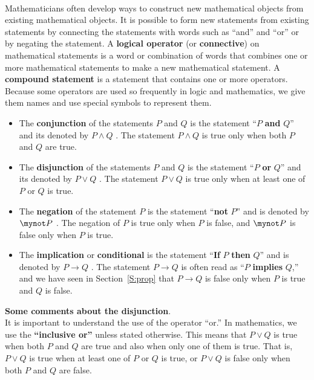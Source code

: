 \begin{previewactivity}\label{PA:compound} \hfill \\
Mathematicians often develop ways to construct new mathematical objects from existing mathematical objects.  It is possible to form new statements from existing statements by connecting the statements with words such as ``and'' and ``or'' or by negating the statement.  A \textbf{logical operator}
%
 (or \textbf{connective})
%
 on mathematical statements is a word or combination of words that combines one or more mathematical statements to make a new mathematical statement.  A \textbf{compound statement}
%
%
 is a statement that contains one or more operators.  Because some operators are used so frequently in logic and mathematics, we give them names and use special symbols to represent them.
\begin{itemize}
  \item The \textbf{conjunction}
%
 of the statements $P$ and $Q$ is the statement ``$P$ \textbf{and} $Q$'' and its denoted by $P \wedge Q$ \label{sym:and} .  The statement $P \wedge Q$ is true only when both $P$ and $Q$ are true.
  \item The \textbf{disjunction}
%
 of the statements $P$ and $Q$ is the statement ``$P$ \textbf{or} $Q$'' and its denoted by $P \vee Q$ \label{sym:or}.  The statement $P \vee Q$ is true only when at least one of $P$ or $Q$ is true.
  \item The \textbf{negation} 
%
of the statement $P$ is the statement ``\textbf{not} $P$'' and is denoted by $\mynot P$ \label{sym:not}.  The negation of $P$ is true only when $P$ is false, and $\mynot P$ is false only when $P$ is true.  
  \item The \textbf{implication} 
%
%
or \textbf{conditional} is the statement ``\textbf{If } $P$ \textbf{then} $Q$'' and is denoted by $P \to Q$ \label{sym:cond2}.  The statement $P \to Q$ is often read as ``$P$ \textbf{implies} $Q$,'' and we have seen in Section~\ref{S:prop} that $P \to Q$ is false only when $P$ is true and $Q$ is false.
\end{itemize}
\newpar
\textbf{Some comments about the disjunction}.  \\It is important to understand the use of the operator ``or.''  In mathematics, we use the \textbf{``inclusive or''}
%
 unless stated otherwise.  This means that  $P \vee Q$ is true when both  $P$  and  $Q$  are true and also when only one of them is true.  That is, $P \vee Q$  is true when at least one of  $P$  or  $Q$  is true, or $P \vee Q$  is false only when both $P$  and  $Q$  are false.


\end{previewactivity}
